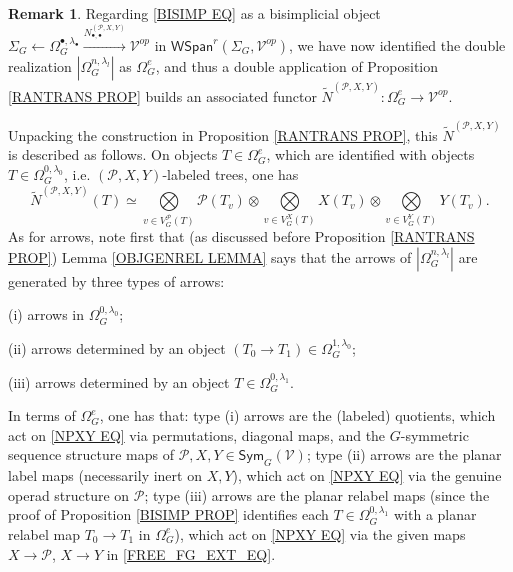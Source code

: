 \documentclass[a4paper,10pt
,draft
]{article}%
\numberwithin{equation}{section}
\numberwithin{figure}{section}
\theoremstyle{definition} %
\newtheorem{remark}[equation]{Remark}%
\renewcommand{\P}{\ensuremath{\mathcal P}}
\newcommand{\1}{\ensuremath{\mathbbm 1}}%
\begin{document}
\begin{remark}\label{TILNUNPACK REM}
	Regarding \ref{BISIMP EQ} as a 
	bisimplicial object
	$\Sigma_G 
	\leftarrow 
	\Omega_G^{\bullet,\lambda_{\bullet}}
	\xrightarrow{N_{\bullet,\bullet}^{(\mathcal P, X,Y)}}
	\mathcal{V}^{op}$
	in $\mathsf{WSpan}^r(\Sigma_G,\mathcal{V}^{op})$,
	we have now identified the double realization
	$|\Omega_G^{n,\lambda_{l}}|$ as $\Omega^e_G$,
	and thus a double application of Proposition \ref{RANTRANS PROP}
	builds an associated functor
	$\tilde{N}^{(\mathcal{P},X,Y)} \colon 
	\Omega^e_G \to \mathcal{V}^{op}$.
	
	Unpacking the construction in Proposition \ref{RANTRANS PROP},
	this $\tilde{N}^{(\mathcal{P},X,Y)}$
	is described as follows.
	On objects $T \in \Omega^e_G$,
	which are identified with objects
	$T \in \Omega_G^{0,\lambda_{0}}$,
	i.e. $(\mathcal{P},X,Y)$-labeled trees, one has
\begin{equation}\label{NPXY EQ}
	\tilde{N}^{(\mathcal{P},X,Y)}(T) 
\simeq
	\bigotimes\limits_{v \in V_{G}^{\P}(T)}\P(T_v) \otimes
	\bigotimes\limits_{v \in V_{G}^{X}(T)}X(T_v) \otimes
	\bigotimes\limits_{v \in V_{G}^{Y}(T)}Y(T_v).
\end{equation}
As for arrows, note first that (as discussed before Proposition \ref{RANTRANS PROP})
Lemma \ref{OBJGENREL LEMMA} says that
the arrows of 
$|\Omega_G^{n,\lambda_{l}}|$
are generated by three types of arrows:
\begin{inparaenum}
	\item[(i)] arrows in $\Omega_G^{0,\lambda_{0}}$;
	\item[(ii)] arrows determined by an object
	$(T_0 \to T_1) \in \Omega_G^{1,\lambda_{0}}$;
	\item[(iii)]
	arrows determined by an object
	$T \in \Omega_G^{0,\lambda_{1}}$.
\end{inparaenum}
In terms of $\Omega^e_G$, one has that:
type (i) arrows are the (labeled) quotients, 
which act on \eqref{NPXY EQ}
via permutations, diagonal maps, and 
the $G$-symmetric sequence structure maps of
$\mathcal{P},X,Y \in \mathsf{Sym}_G(\mathcal{V})$;
type (ii) arrows are the planar label maps
(necessarily inert on $X,Y$),
which act on \eqref{NPXY EQ}
via the genuine operad structure on $\mathcal{P}$;
type (iii) arrows are the planar relabel maps
(since the proof of Proposition \eqref{BISIMP PROP}
identifies each $T \in \Omega_G^{0,\lambda_{1}}$
with a planar relabel map $T_0 \to T_1$ in $\Omega^e_G$),
which act on \eqref{NPXY EQ} via the given maps
$X \to \mathcal{P}$, $X \to Y$
in \eqref{FREE_FG_EXT_EQ}.
\end{remark}
\end{document}
